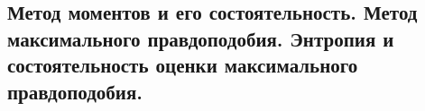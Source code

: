 \subsection{Метод моментов и его состоятельность. Метод максимального правдоподобия. Энтропия и состоятельность оценки максимального правдоподобия.}
